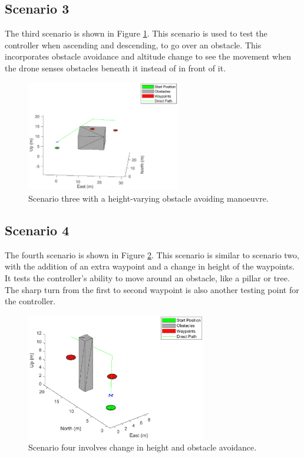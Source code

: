 \subsection{Scenario 3}
The third scenario is shown in Figure \ref{fig:3_3_scenario3}. This scenario is used to test the controller when ascending and descending, to go over an obstacle. This incorporates obstacle avoidance and altitude change to see the movement when the drone senses obstacles beneath it instead of in front of it.
\begin{figure}[H]
    \centering
    \includegraphics[width = 0.6\textwidth]{./img/3_3_scenario3}
    \caption{Scenario three with a height-varying obstacle avoiding manoeuvre.}
    \label{fig:3_3_scenario3}
\end{figure}

\subsection{Scenario 4}
The fourth scenario is shown in Figure \ref{fig:3_3_scenario4}. This scenario is similar to scenario two, with the addition of an extra waypoint and a change in height of the waypoints. It tests the controller's ability to move around an obstacle, like a pillar or tree. The sharp turn from the first to second waypoint is also another testing point for the controller.
\begin{figure}[H]
    \centering
    \includegraphics[width = 0.7\textwidth]{./img/3_3_scenario4}
    \caption{Scenario four involves change in height and obstacle avoidance.}
    \label{fig:3_3_scenario4}
\end{figure}

